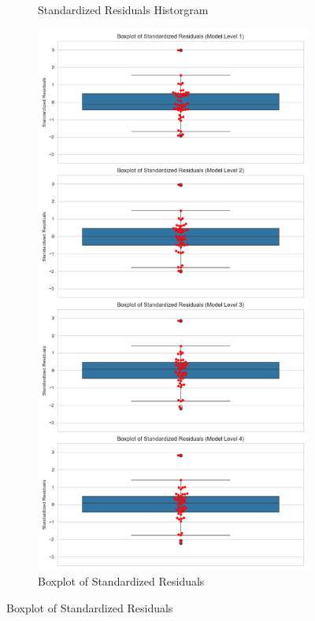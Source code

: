 \documentclass[11pt, oneside]{article}   	%
\begin{document}
\begin{figure}[H]
\begin{subfigure}{.5\textwidth}
  \caption{Standardized Residuals Historgram}
\end{subfigure}%
\begin{subfigure}{.5\textwidth}
  \centering
  \includegraphics[width=\linewidth]{../plots/fnn_data/hierarchy1/std_residuals}
  \caption{Boxplot of Standardized Residuals}
\end{subfigure}
\end{figure}
\end{document}
